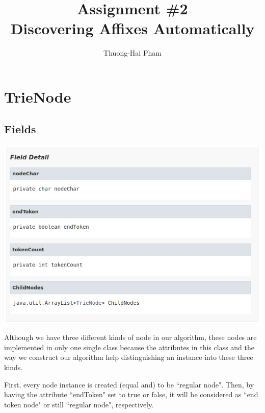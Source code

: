 \documentclass[12pt]{article}
\title{Assignment \#2\\Discovering Affixes Automatically}
\author{Thuong-Hai Pham}
\begin{document}
\maketitle

\begin{abstract}

\end{abstract}

\section{TrieNode} \label{trienode}

\subsection{Fields}
\begin{center}
	\includegraphics[width=\textwidth]{trie_node_fields}
\end{center}

Although we have three different kinds of node in our algorithm, these nodes are implemented in only one single class because the attributes in this class and the way we construct our algorithm help distinguishing an instance into these three kinds.

First, every node instance is created (equal and) to be ``regular node". Then, by having the attribute ``endToken" set to true or false, it will be considered as ``end token node" or still ``regular node", respectively.
\end{document}
